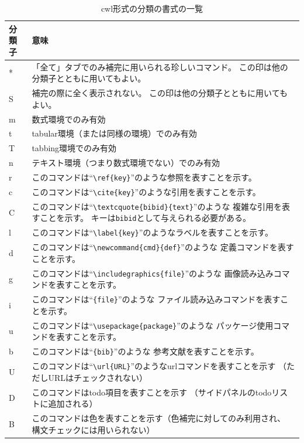 \begin{table}[H]
  \centering
  \caption{cwl形式の分類の書式の一覧}
  \begin{tabularx}{\linewidth}{lX}
    \hline
    \textbf{分類子} & \textbf{意味}\\
    \hline
    * & 「全て」タブでのみ補完に用いられる珍しいコマンド。
      この印は他の分類子とともに用いてもよい。\\
    S & 補完の際に全く表示されない。 この印は他の分類子とともに用いてもよい。\\
    m & 数式環境でのみ有効\\
    t & tabular環境（または同様の環境）でのみ有効\\
    T & tabbing環境でのみ有効\\
    n & テキスト環境（つまり数式環境でない）でのみ有効\\
    r & このコマンドは``\verb+\ref+\verb+{key}+''のような参照を表すことを示す。\\
    c & このコマンドは``\verb+\cite+\verb+{key}+''のような引用を表すことを示す。\\
    C & このコマンドは``\verb+\textcquote+\verb+{bibid}{text}+''のような
      複雑な引用を表すことを示す。
      キーは\verb+bibid+として与えられる必要がある。\\
    l & このコマンドは``\verb+\label+\verb+{key}+''のようなラベルを表すことを示す。\\
    d & このコマンドは``\verb+\newcommand+\verb+{cmd}{def}+''のような
      定義コマンドを表すことを示す。\\
    g & このコマンドは``\verb+\includegraphics+\verb+{file}+''のような
      画像読み込みコマンドを表すことを示す。\\
    i & このコマンドは``\verb++\verb+{file}+''のような
      ファイル読み込みコマンドを表すことを示す。\\
    u & このコマンドは``\verb+\usepackage+\verb+{package}+''のような
      パッケージ使用コマンドを表すことを示す。\\
    b & このコマンドは``\verb++\verb+{bib}+''のような
      参考文献を表すことを示す。\\
    U & このコマンドは``\verb+\url+\verb+{URL}+''のようなurlコマンドを表すことを示す
      （ただしURLはチェックされない）\\
    D & このコマンドはtodo項目を表すことを示す
      （サイドパネルのtodoリストに追加される）\\
    B & このコマンドは色を表すことを示す（色補完に対してのみ利用され、
       構文チェックには用いられない）\\

\end{tabularx}
\end{table}
